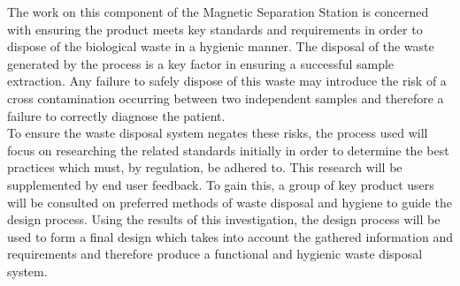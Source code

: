 The work on this component of the Magnetic Separation Station is concerned with ensuring the product meets key standards and requirements in order to dispose of the biological waste in a hygienic manner. The disposal of the waste generated by the process is a key factor in ensuring a successful sample extraction. Any failure to safely dispose of this waste may introduce the risk of a cross contamination occurring between two independent samples and therefore a failure to correctly diagnose the patient.\\

To ensure the waste disposal system negates these risks, the process used will focus on researching the related standards initially in order to determine the best practices which must, by regulation, be adhered to. This research will be supplemented by end user feedback. To gain this, a group of key product users will be consulted on preferred methods of waste disposal and hygiene to guide the design process. Using the results of this investigation, the design process will be used to form a final design which takes into account the gathered information and requirements and therefore produce a functional and hygienic waste disposal system.